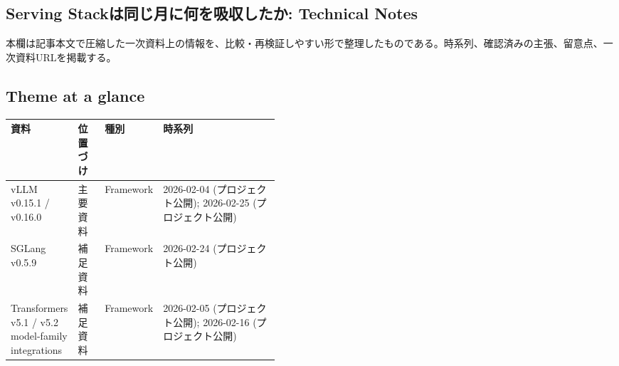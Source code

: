 \subsection*{Serving Stackは同じ月に何を吸収したか: Technical Notes}
本欄は記事本文で圧縮した一次資料上の情報を、比較・再検証しやすい形で整理したものである。時系列、確認済みの主張、留意点、一次資料URLを掲載する。
\medskip
\subsection*{Theme at a glance}
\begin{center}
\footnotesize
\begin{tabularx}{\linewidth}{@{}p{0.20\linewidth}p{0.10\linewidth}p{0.14\linewidth}X@{}}
\toprule
資料 & 位置づけ & 種別 & 時系列 \\
\midrule
vLLM v0.15.1 / v0.16.0 & 主要資料 & Framework & 2026-02-04 (プロジェクト公開); 2026-02-25 (プロジェクト公開) \\
SGLang v0.5.9 & 補足資料 & Framework & 2026-02-24 (プロジェクト公開) \\
Transformers v5.1 / v5.2 model-family integrations & 補足資料 & Framework & 2026-02-05 (プロジェクト公開); 2026-02-16 (プロジェクト公開) \\
\bottomrule
\end{tabularx}
\end{center}
\normalsize


